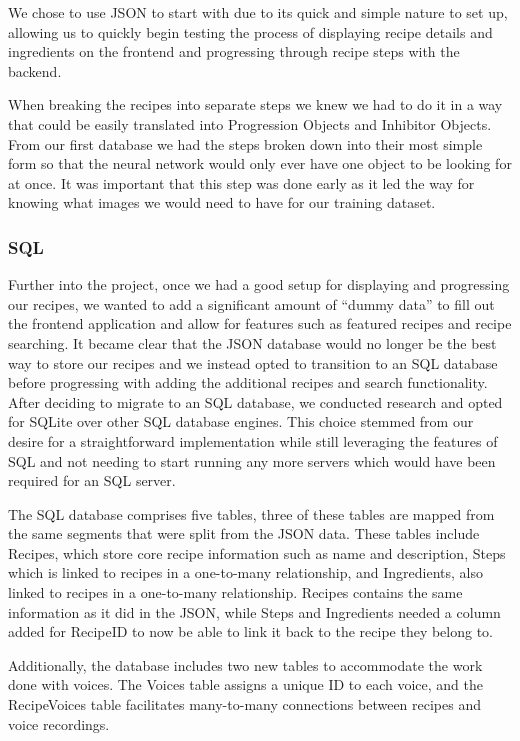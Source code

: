 \documentclass{article}
\begin{document}
    We chose to use JSON to start with due to its quick and simple nature to set up, allowing us to quickly begin testing the process of displaying recipe details and ingredients on the frontend and progressing through recipe steps with the backend.
    
    When breaking the recipes into separate steps we knew we had to do it in a way that could be easily translated into Progression Objects and Inhibitor Objects. From our first database we had the steps broken down into their most simple form so that the neural network would only ever have one object to be looking for at once. It was important that this step was done early as it led the way for knowing what images we would need to have for our training dataset.
    \subsubsection{SQL}
    Further into the project, once we had a good setup for displaying and progressing our recipes, we wanted to add a significant amount of “dummy data” to fill out the frontend application and allow for features such as featured recipes and recipe searching. It became clear that the JSON database would no longer be the best way to store our recipes and we instead opted to transition to an SQL database before progressing with adding the additional recipes and search functionality.
    After deciding to migrate to an SQL database, we conducted research and opted for SQLite over other SQL database engines. This choice stemmed from our desire for a straightforward implementation while still leveraging the features of SQL and not needing to start running any more servers which would have been required for an SQL server.
    
    The SQL database comprises five tables, three of these tables are mapped from the same segments that were split from the JSON data. These tables include Recipes, which store core recipe information such as name and description, Steps which is linked to recipes in a one-to-many relationship, and Ingredients, also linked to recipes in a one-to-many relationship. Recipes contains the same information as it did in the JSON, while Steps and Ingredients needed a column added for RecipeID to now be able to link it back to the recipe they belong to.
    
    Additionally, the database includes two new tables to accommodate the work done with voices. The Voices table assigns a unique ID to each voice, and the Recipe\textunderscore Voices table facilitates many-to-many connections between recipes and voice recordings.
\end{document}
